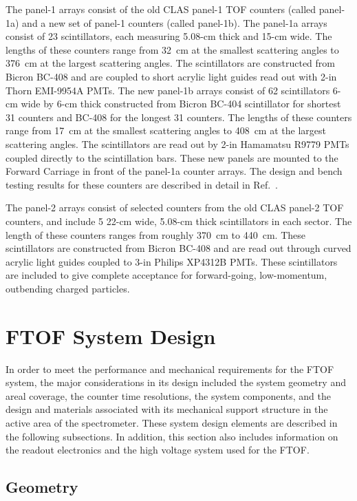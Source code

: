 \documentclass[3p,times,twocolumn]{elsarticle}
\begin{document}
The panel-1 arrays consist of the old CLAS panel-1 TOF counters (called panel-1a) and a new set of panel-1
counters (called panel-1b).  The panel-1a arrays consist of 23 scintillators, each measuring 5.08-cm thick
and 15-cm wide.  The lengths of these counters range from 32~cm at the smallest scattering angles to
376~cm at the largest scattering angles.  The scintillators are constructed from Bicron BC-408 and are
coupled to short acrylic light guides read out with 2-in Thorn EMI-9954A PMTs.  The new panel-1b arrays
consist of 62 scintillators 6-cm wide by 6-cm thick constructed from Bicron BC-404 scintillator for shortest
31 counters and BC-408 for the longest 31 counters. The lengths of these counters range from 17~cm at the
smallest scattering angles to 408~cm at the largest scattering angles. The scintillators are read out by 2-in
Hamamatsu R9779 PMTs coupled directly to the scintillation bars. These new panels are mounted to the
Forward Carriage in front of the panel-1a counter arrays. The design and bench testing results for these
counters are described in detail in Ref.~\cite{nim-p1b}.

The panel-2 arrays consist of selected counters from the old CLAS panel-2 TOF counters, and include 5
22-cm wide, 5.08-cm thick scintillators in each sector.  The length of these counters ranges from roughly
370~cm to 440~cm.  These scintillators are constructed from Bicron BC-408 and are read out through
curved acrylic light guides coupled to 3-in Philips XP4312B PMTs. These scintillators are included to give
complete acceptance for forward-going, low-momentum, outbending charged particles.  

\section{FTOF System Design}
\label{sec:design}

In order to meet the performance and mechanical requirements for the FTOF system, the major
considerations in its design included the system geometry and areal coverage, the counter time resolutions,
the system components, and the design and materials associated with its mechanical support structure in
the active area of the spectrometer. These system design elements are described in the following
subsections. In addition, this section also includes information on the readout electronics and the high
voltage system used for the FTOF.

\subsection{Geometry}
\label{ftof-geometry}
\end{document}
